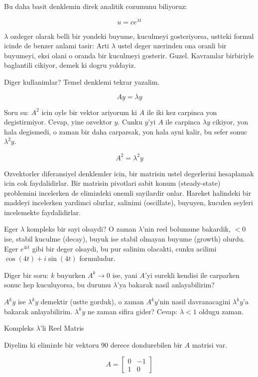 \documentclass[12pt,fleqn]{article}\usepackage{../common}
\begin{document}
Bu daha basit denklemin direk analitik cozumunu biliyoruz:

\[ u = ce^{\lambda t} \]

$\lambda$ ozdeger olarak belli bir yondeki buyume, kuculmeyi gosteriyorsa,
ustteki formul icinde de benzer anlami tasir: Arti $\lambda$ ustel deger
uzerinden ona oranli bir buyumeyi, eksi olani o oranda bir kuculmeyi
gosterir. Guzel. Kavramlar birbiriyle baglantili cikiyor, demek ki dogru
yoldayiz.

Diger kullanimlar? Temel denklemi tekrar yazalim. 

\[ Ay = \lambda y \]

Soru su: $A^2$ icin oyle bir vektor ariyorum ki $A$ ile iki kez carpinca
yon degistirmiyor. Cevap, yine ozvektor $y$. Cunku $y$'yi $A$ ile carpinca
$\lambda y$ cikiyor, yon hala degismedi, o zaman bir daha carparsak, yon
hala ayni kalir, bu sefer sonuc $\lambda^2y$.

\[ A^2 = \lambda^2 y \]

Ozvektorler diferansiyel denklemler icin, bir matrisin ustel degerlerini
hesaplamak icin cok faydalidirlar. Bir matrisin pivotlari sabit konum
(steady-state) problemini incelerken de elimizdeki onemli sayilardir
onlar. Hareket halindeki bir maddeyi incelerken yardimci olurlar, salinimi
(oscillate), buyuyen, kuculen seyleri incelemekte faydalidirlar.

Eger $\lambda$ kompleks bir sayi olsaydi? O zaman $\lambda$'nin reel
bolumune bakardik, $< 0$ ise, stabil kuculme (decay), buyuk ise stabil
olmayan buyume (growth) olurdu. Eger $e^{4it}$ gibi bir deger olsaydi, bu
pur salinim olacakti, cunku acilimi $\cos(4t) + i\sin(4t)$ formuludur.

Diger bir soru: $k$ buyurken $A^k \to 0$ ise, yani $A$'yi surekli kendisi
ile carparken sonuc hep kuculuyorsa, bu durumu $\lambda$'ya bakarak nasil
anlayabilirim? 

$A^ky$ ise $\lambda^ky$ demektir (ustte gorduk), o zaman $A^ky$'nin nasil
davranacagini $\lambda^ky$'a bakarak anlayabilirim. $\lambda^ky$ ne zaman
sifira gider? Cevap: $\lambda < 1$ oldugu zaman.

Kompleks $\lambda$'li Reel Matris

Diyelim ki elimizde bir vektoru 90 derece dondurebilen bir $A$ matrisi
var. 

\[ 
A = 
\left[
\begin{array}{rr}
0 & -1 \\
1 & 0
\end{array}
\right]
 \]
\end{document}
